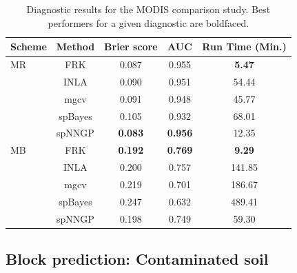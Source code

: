 \documentclass[12pt,a4paper]{article}
\begin{document}
\begin{table}
    \centering
    \caption{Diagnostic results for the MODIS comparison study. Best performers for a given diagnostic are boldfaced.}
    \label{tab:summary_of_analyses}
    \begin{tabular}{lcccc}
    \hline\hline
   Scheme &  Method  & Brier score & AUC &  Run Time (Min.) \\
   \hline
   \hline
  MR & FRK & 0.087 & 0.955 & \textbf{5.47} \\ 
   & INLA & 0.090 & 0.951 & 54.44 \\ 
   & mgcv & 0.091 & 0.948 & 45.77 \\ 
   & spBayes & 0.105 & 0.932 & 68.01 \\ 
   & spNNGP & \textbf{0.083} & \textbf{0.956} & 12.35 \\  
   \hline 
MB & FRK & \textbf{0.192} & \textbf{0.769} & \textbf{9.29} \\ 
   & INLA & 0.200 & 0.757 & 141.85 \\ 
   & mgcv & 0.219 & 0.701 & 186.67 \\ 
   & spBayes & 0.247 & 0.632 & 489.41 \\ 
   & spNNGP & 0.198 & 0.749 & 59.30 \\     
   \hline    
   \hline
  \end{tabular}
\end{table}
 






\subsection{Block prediction: Contaminated soil}\label{sec:block_prediction}
\end{document}
